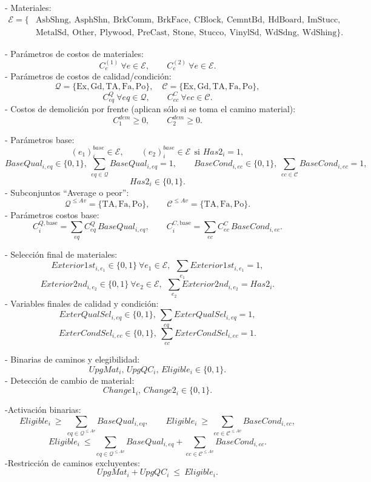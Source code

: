 \begin{itemize}
   - Materiales:
\[
\begin{aligned}
\mathcal{E} = \{&
\text{AsbShng},\ \text{AsphShn},\ \text{BrkComm},\ \text{BrkFace},\
\text{CBlock},\ \text{CemntBd},\ \text{HdBoard},\ \text{ImStucc},\\
&\text{MetalSd},\ \text{Other},\ \text{Plywood},\ \text{PreCast},\
\text{Stone},\ \text{Stucco},\ \text{VinylSd},\ \text{WdSdng},\ \text{WdShing}\}.
\end{aligned}
\]


- Parámetros de costos de materiales:
\[
C^{(1)}_e \ \forall e\in\mathcal{E}, \qquad
C^{(2)}_e \ \forall e\in\mathcal{E}.
\]
- Parámetros de costos de calidad/condición:
\[
\mathcal{Q}=\{\text{Ex},\text{Gd},\text{TA},\text{Fa},\text{Po}\},\quad
\mathcal{C}=\{\text{Ex},\text{Gd},\text{TA},\text{Fa},\text{Po}\},
\]
\[
C^{Q}_{eq}\ \forall eq\in\mathcal{Q}, \qquad C^{C}_{ec}\ \forall ec\in\mathcal{C}.
\]
- Costos de demolición por frente (aplican sólo si se toma el camino material):
\[
C^{dem}_{1}\ge 0,\qquad C^{dem}_{2}\ge 0.
\]

- Parámetros base:
\[
(e_1)^{base}_i \in \mathcal{E}, \qquad
(e_2)^{base}_i \in \mathcal{E}\ \ \text{si } Has2_i=1,
\]
\[
BaseQual_{i,eq}\in\{0,1\},\ \sum_{eq\in\mathcal{Q}} BaseQual_{i,eq}=1,\qquad
BaseCond_{i,ec}\in\{0,1\},\ \sum_{ec\in\mathcal{C}} BaseCond_{i,ec}=1,
\]
\[
Has2_i\in\{0,1\}.
\]
- Subconjuntos “Average o peor”:
\[
\mathcal{Q}^{\le Av}=\{\text{TA},\text{Fa},\text{Po}\},\qquad
\mathcal{C}^{\le Av}=\{\text{TA},\text{Fa},\text{Po}\}.
\]
- Parámetros costos base:
\[
C^{Q,\text{base}}_i=\sum_{eq} C^Q_{eq}\, BaseQual_{i,eq},\qquad
C^{C,\text{base}}_i=\sum_{ec} C^C_{ec}\, BaseCond_{i,ec}.
\]

- Selección final de materiales:
\[
Exterior1st_{i,e_1}\in\{0,1\}\ \forall e_1\in\mathcal{E},\ \ 
\sum_{e_1} Exterior1st_{i,e_1}=1,
\]
\[
Exterior2nd_{i,e_2}\in\{0,1\}\ \forall e_2\in\mathcal{E},\ \
\sum_{e_2} Exterior2nd_{i,e_2}=Has2_i.
\]
- Variables finales de calidad y condición:
\[
ExterQualSel_{i,eq}\in\{0,1\},\ \sum_{eq} ExterQualSel_{i,eq}=1,
\]
\[
ExterCondSel_{i,ec}\in\{0,1\},\ \sum_{ec} ExterCondSel_{i,ec}=1.
\]

- Binarias de caminos y elegibilidad:
\[
UpgMat_i,\, UpgQC_i,\, Eligible_i \in\{0,1\}.
\]
- Detección de cambio de material:
\[
Change1_i,\, Change2_i \in \{0,1\}.
\]

-Activación binarias:
\[
Eligible_i \ \ge\ \sum_{eq\in\mathcal{Q}^{\le Av}} BaseQual_{i,eq},\qquad
Eligible_i \ \ge\ \sum_{ec\in\mathcal{C}^{\le Av}} BaseCond_{i,ec},
\]
\[
Eligible_i \ \le\ \sum_{eq\in\mathcal{Q}^{\le Av}} BaseQual_{i,eq}
           + \sum_{ec\in\mathcal{C}^{\le Av}} BaseCond_{i,ec}.
\]
-Restricción de caminos excluyentes:
\[
UpgMat_i + UpgQC_i \ \le\ Eligible_i.
\]


\end{itemize}
